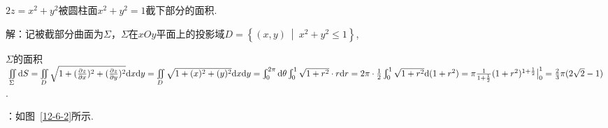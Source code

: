 \documentclass[12pt,UTF8]{ctexart}
\newcommand\Set[2]{\left\{#1\ \middle\vert\ #2 \right\}}
\newcommand{\Int}[4]{\varint\nolimits_{#1}^{#2}#3\mathrm d#4}
\newcommand{\varIInt}[4]{\iint\limits_{#1}#2\mathrm d#3\mathrm d#4}
\newcommand{\SIInt}[3]{\iint\limits_{#1}#2\mathrm d#3}
\begin{document}
\begin{enumerate}
$2z=x^2+y^2$被圆柱面$x^2+y^2=1$截下部分的面积.

解：记被截部分曲面为$\Sigma$，$\Sigma$在$xOy$平面上的投影域$D=\Set{(x,y)}{x^2+y^2\leqslant1}$,

$\Sigma$的面积$\SIInt\Sigma{}S=\varIInt D{\sqrt{1+(\frac{\partial z}{\partial x})^2+(\frac{\partial z}{\partial y})^2}}xy=\varIInt D{\sqrt{1+(x)^2+(y)^2}}xy=\Int0{2\pi}{}\theta\Int01{\sqrt{1+r^2}\cdot r}r\\
=2\pi\cdot\frac12\Int01{\sqrt{1+r^2}}{(1+r^2)}=\pi\frac{1}{1+\frac12}(1+r^2)^{1+\frac12}\big|_0^1=\frac23\pi(2\sqrt2-1)$.

{：}如图~\ref{12-6-2}所示.
\begin{figure}[H]
\begin{center}
\end{center}
\end{figure}
\addtocounter{figure}{-1}
\begin{figure}[H]
\addtocounter{figure}{1}
\begin{center}

\end{center}
\end{figure}
\end{enumerate}
\end{document}
